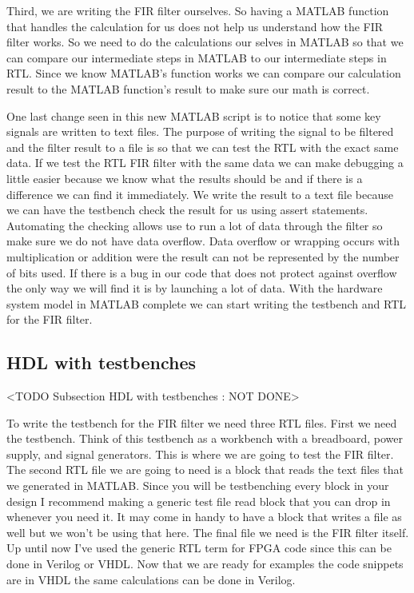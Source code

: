 Third, we are writing the \ac{FIR} filter ourselves. So having a MATLAB function that handles the calculation for us does not help us understand how the \ac{FIR} filter works. So we need to do the calculations our selves in MATLAB so that we can compare our intermediate steps in MATLAB to our intermediate steps in \ac{RTL}. Since we know MATLAB's function works we can compare our calculation result to the MATLAB function's result to make sure our math is correct.



One last change seen in this new MATLAB script is to notice that some key signals are written to text files. The purpose of writing the signal to be filtered and the filter result to a file is so that we can test the \ac{RTL} with the exact same data. If we test the \ac{RTL} \ac{FIR} filter with the same data we can make debugging a little easier because we know what the results should be and if there is a difference we can find it immediately. We write the result to a text file because we can have the testbench check the result for us using assert statements. Automating the checking allows use to run a lot of data through the filter so make sure we do not have data overflow. Data overflow or wrapping occurs with multiplication or addition were the result can not be represented by the number of bits used. If there is a bug in our code that does not protect against overflow the only way we will find it is by launching a lot of data.  With the hardware system model in MATLAB complete we can start writing the testbench and \ac{RTL} for the \ac{FIR} filter.

	
\subsection{HDL with testbenches}
	<TODO Subsection HDL with testbenches : NOT DONE>

To write the testbench for the \ac{FIR} filter we need three \ac{RTL} files. First we need the testbench. Think of this testbench as a workbench with a breadboard, power supply, and signal generators. This is where we are going to test the \ac{FIR} filter. The second \ac{RTL} file we are going to need is a block that reads the text files that we generated in MATLAB. Since you will be testbenching every block in your design I recommend making a generic test file read block that you can drop in whenever you need it. It may come in handy to have a block that writes a file as well but we won't be using that here. The final file we need is the \ac{FIR} filter itself. Up until now I've used the generic \ac{RTL} term for \ac{FPGA} code since this can be done in Verilog or \ac{VHDL}. Now that we are ready for examples the code snippets are in \ac{VHDL} the same calculations can be done in Verilog.



